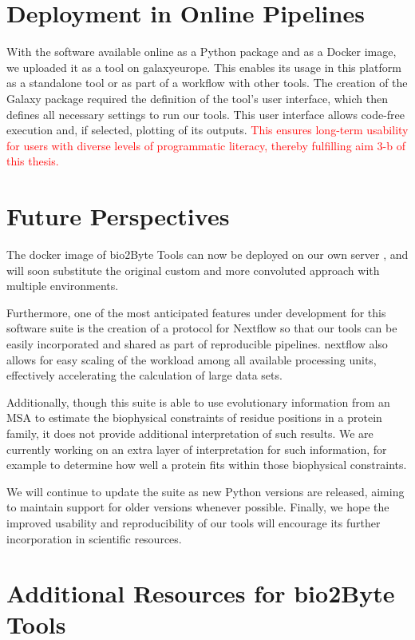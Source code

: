 \section{Deployment in Online Pipelines}
With the software available online as a Python package and as a Docker image, we uploaded it as a tool on \gls{galaxyeurope}. This enables its usage in this platform as a standalone tool or as part of a workflow with other tools. The creation of the Galaxy package required the definition of the tool's user interface, which then defines all necessary settings to run our tools. This user interface allows code-free execution and, if selected, plotting of its outputs. \textcolor{red}{This ensures long-term usability for users with diverse levels of programmatic literacy, thereby fulfilling aim 3-b of this thesis.}

\section{Future Perspectives}

The docker image of bio2Byte Tools can now be deployed on our own server \cite{kagami_b2btools_2021}, and will soon substitute the original custom and more convoluted approach with multiple environments. 

Furthermore, one of the most anticipated features under development for this software suite is the creation of a protocol for Nextflow \cite{di_tommaso_nextflow_2017} so that our tools can be easily incorporated and shared as part of reproducible pipelines. \Gls{nextflow} also allows for easy scaling of the workload among all available processing units, effectively accelerating the calculation of large data sets. 

Additionally, though this suite is able to use evolutionary information from an MSA to estimate the biophysical constraints of residue positions in a protein family, it does not provide additional interpretation of such results. We are currently working on an extra layer of interpretation for such information, for example to determine how well a protein fits within those biophysical constraints. 

We will continue to update the suite as new Python versions are released, aiming to maintain support for older versions whenever possible. Finally, we hope the improved usability and reproducibility of our tools will encourage its further incorporation in scientific resources.


\section*{Additional Resources for bio2Byte Tools}

